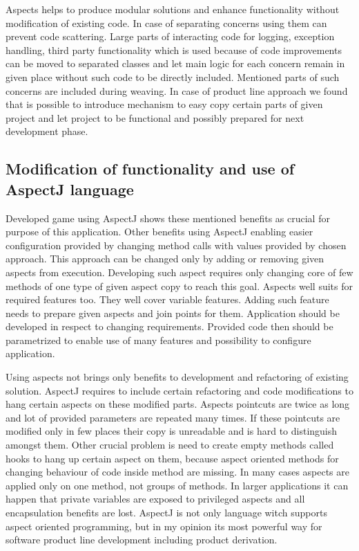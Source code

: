 \documentclass[11pt,english,a4paper,twoside]{article}
\begin{document}
Aspects helps to produce modular solutions and enhance functionality without modification of existing code. In case of separating concerns using them can prevent code scattering. Large parts of interacting code for logging, exception handling, third party functionality which is used because of code improvements can be moved to separated classes and let main logic for each concern remain in given place without such code to be directly included. Mentioned parts of such concerns are included during weaving. In case of product line approach we found that is possible to introduce mechanism to easy copy certain parts of given project and let project to be functional and possibly prepared for next development phase. 


\subsection{Modification of functionality and use of AspectJ language} \label{functionalityModiffication}

Developed game using AspectJ shows these mentioned benefits as crucial for purpose of this application. Other benefits using AspectJ enabling easier configuration provided by changing method calls with values provided by chosen approach. This approach can be changed only by adding or removing given aspects from execution. Developing such aspect requires only changing core of few methods of one type of given aspect copy to reach this goal. Aspects well suits for required features too. They well cover variable features. Adding such feature needs to prepare given aspects and join points for them. Application should be developed in respect to changing requirements. Provided code then should be parametrized to enable use of many features and possibility to configure application.

Using aspects not brings only benefits to development and refactoring of existing solution. AspectJ requires to include certain refactoring and code modifications to hang certain aspects on these modified parts. Aspects pointcuts are twice as long and lot of provided parameters are repeated many times. If these pointcuts are modified only in few places their copy is unreadable and is hard to distinguish amongst them. Other crucial problem is need to create empty methods called hooks to hang up certain aspect on them, because aspect oriented methods for changing behaviour of code inside method are missing. In many cases aspects are applied only on one method, not groups of methods. In larger applications it can happen that private variables are exposed to privileged aspects and all encapsulation benefits are lost. AspectJ is not only language witch supports aspect oriented programming, but in my opinion its most powerful way for software product line development including product derivation.
\end{document}

